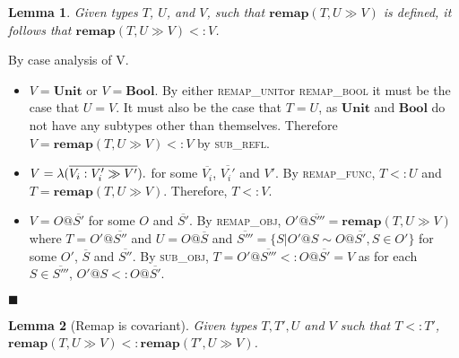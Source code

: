 \documentclass{article}
\newtheorem{lem}{Lemma}
\newcommand{\subrefl}{\textsc{sub\_refl}}
\newcommand{\subobj}{\textsc{sub\_obj}}
\newcommand{\remapunit}{\textsc{remap\_unit}}
\newcommand{\remapbool}{\textsc{remap\_bool}}
\newcommand{\remapfunc}{\textsc{remap\_func}}
\newcommand{\remapobj}{\textsc{remap\_obj}}
\newcommand{\remapapp}[3]{\ensuremath{\mathbf{remap}(#1, #2 \gg #3)}}
\newcommand{\unitt}{\mathbf{Unit}}
\newcommand{\boolt}{\mathbf{Bool}}
\newcommand{\funv}[4]{\lambda(\overline{#1 : #2 \gg #3}).#4}
\newcommand{\qed}{$\blacksquare$}
\newenvironment{proof}{\vspace{1ex}\noindent{\bf Proof}\hspace{0.5em}}
  {\hfill\qed\vspace{1ex}}
\begin{document}
\begin{lem}
\label{lem:remap}
Given types $T$, $U$, and $V$, such that
$\remapapp{T}{U}{V}$ is defined, it follows that $\remapapp{T}{U}{V} <: V$.
\end{lem}
\begin{proof}
By case analysis of V.

\begin{itemize}
\item $V = \unitt$ or $V = \boolt$. By either \remapunit or \remapbool
it must be the case that $U = V$. It must also be the case that
$T = U$, as $\unitt$ and $\boolt$ do not have any subtypes other than
themselves. Therefore $V = \remapapp{T}{U}{V} <: V$ by \subrefl.

\item $V = \funv{V_i}{V_i'}{V'}$ for some $\overline{V_i}$, $\overline{V_i'}$
and $V'$. By \remapfunc, $T <: U$ and $T = \remapapp{T}{U}{V}$. Therefore,
$T <: V$.

\item $V = O@\overline{S'}$ for some $O$ and $\overline{S'}$. By
\remapobj, $O'@\overline{S'''} = \remapapp{T}{U}{V}$ where 
$T = O'@\overline{S''}$ and $U = O@\overline{S}$ and
$\overline{S'''} = \{ S | O'@S \sim O@\overline{S'}, S \in O' \}$ 
for some $O'$, $\overline{S}$ and $\overline{S''}$. By \subobj,
$T = O'@\overline{S'''} <: O@\overline{S'} = V$ as for each $S \in \overline{S'''}$,
$O'@S <: O@\overline{S'}$.
\end{itemize}
\end{proof}

\begin{lem}[Remap is covariant]
\label{lem:remapcv}
Given types $T, T', U$ and $V$ such that $T <: T'$, 
$\remapapp{T}{U}{V} <: \remapapp{T'}{U}{V}$.
\end{lem}
\end{document}
